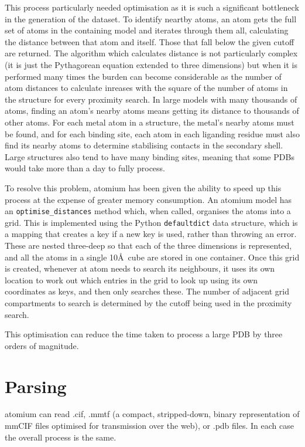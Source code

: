 This process particularly needed optimisation as it is such a significant bottleneck in the generation of the dataset. To identify neartby atoms, an atom gets the full set of atoms in the containing model and iterates through them all, calculating the distance between that atom and itself. Those that fall below the given cutoff are returned. The algorithm which calculates distance is not particularly complex (it is just the Pythagorean equation extended to three dimensions) but when it is performed many times the burden can become considerable as the number of atom distances to calculate inreases with the square of the number of atoms in the structure for every proximity search. In large models with many thousands of atoms, finding an atom's nearby atoms means getting its distance to thousands of other atoms. For each metal atom in a structure, the metal's nearby atoms must be found, and for each binding site, each atom in each liganding residue must also find its nearby atoms to determine stabilising contacts in the secondary shell. Large structures also tend to have many binding sites, meaning that some PDBs would take more than a day to fully process.

\setlength{\emergencystretch}{1em}
To resolve this problem, atomium has been given the ability to speed up this process at the expense of greater memory consumption. An atomium model has an \texttt{optimise\_distances} method which, when called, organises the atoms into a grid. This is implemented using the Python \texttt{defaultdict} data structure, which is a mapping that creates a key if a new key is used, rather than throwing an error. These are nested three-deep so that each of the three dimensions is represented, and all the atoms in a single 10\AA\ cube are stored in one container. Once this grid is created, whenever at atom needs to search its neighbours, it uses its own location to work out which entries in the grid to look up using its own coordinates as keys, and then only searches these. The number of adjacent grid compartments to search is determined by the cutoff being used in the proximity search.

This optimisation can reduce the time taken to process a large PDB by three orders of magnitude.

\section{Parsing}

atomium can read .cif, .mmtf (a compact, stripped-down, binary representation of mmCIF files optimised for transmission over the web), or .pdb files. In each case the overall process is the same.

